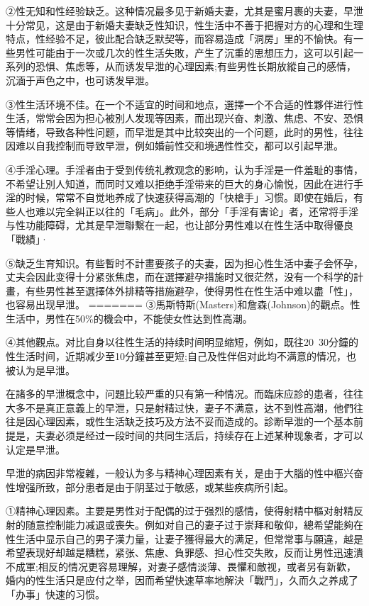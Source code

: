 \documentclass[12pt,UTF8]{ctexbook}
\begin{document}
②性无知和性经验缺乏。这种情况最多见于新婚夫妻，尤其是蜜月裹的夫妻，早泄十分常见，这是由于新婚夫妻缺乏性知识，性生活中不善于把握对方的心理和生理特点，性经验不足，彼此配合缺乏默契等，而容易造成「洞房」里的不愉快。有一些男性可能由于一次或几次的性生活失敗，产生了沉重的思想压力，这可以引起一系列的恐惧、焦虑等，从而诱发早泄的心理因素;有些男性长期放縱自己的感情，沉湎于声色之中，也可诱发早泄。

③性生活环境不佳。在一个不适宜的时间和地点，選擇一个不合适的性夥伴进行性生活，常常会因为担心被別人发现等因素，而出现兴奋、刺激、焦虑、不安、恐惧等情绪，导致各种性问题，而早泄是其中比较突出的一个问题，此时的男性，往往因难以自我控制而导致早泄，例如婚前性交和境遇性性交，都可以引起早泄。

④手淫心理。手淫者由于受到传统礼教观念的影响，认为手淫是一件羞耻的事情，不希望让別人知道，而同时又难以拒绝手淫带来的巨大的身心愉悦，因此在进行手淫的时候，常常不自觉地养成了快速获得高潮的「快槍手」习惯。即使在婚后，有些人也难以完全糾正以往的「毛病」。此外，部分「手淫有害论」者，还常将手淫与性功能障碍，尤其是早泄聯繫在一起，也让部分男性难以在性生活中取得優良「戰績」·

⑤缺乏生育知识。有些暫时不計畫要孩子的夫妻，因为担心性生活中妻子会怀孕，丈夫会因此变得十分紧张焦虑，而在選擇避孕措施时又很茫然，没有一个科学的計畫，有些男性甚至選擇体外排精等措施避孕，使得男性在性生活中难以盡「性」，也容易出现早泄。
=======
③馬斯特斯(Masters)和詹森(Johnson)的觀点。性生活中，男性在50\%的機会中，不能使女性达到性高潮。

④其他觀点。对比自身以往性生活的持续时间明显缩短，例如，既往20~30分鐘的性生活时间，近期减少至10分鐘甚至更短;自己及性伴侣对此均不满意的情况，也被认为是早泄。

在諸多的早泄概念中，问題比较严重的只有第一种情况。而臨床应診的患者，往往大多不是真正意義上的早泄，只是射精过快，妻子不满意，达不到性高潮，他們往往是因心理因素，或性生活缺乏技巧及方法不妥而造成的。診断早泄的一个基本前提是，夫妻必须是经过一段时间的共同生活后，持续存在上述某种现象者，才可以认定是早泄。

早泄的病因非常複雜，一般认为多与精神心理因素有关，是由于大腦的性中樞兴奋性增强所致，部分患者是由于阴茎过于敏感，或某些疾病所引起。

①精神心理因素。主要是男性对于配偶的过于强烈的感情，使得射精中樞对射精反射的随意控制能力减退或喪失。例如对自己的妻子过于崇拜和敬仰，總希望能夠在性生活中显示自己的男子漢力量，让妻子獲得最大的满足，但常常事与願違，越是希望表现好却越是糟糕，紧张、焦慮、負罪感、担心性交失敗，反而让男性迅速潰不成軍;相反的情况更容易理解，对妻子感情淡薄、畏懼和敵视，或者另有新歡，婚内的性生活只是应付之举，因而希望快速草率地解決「戰鬥」，久而久之养成了「办事」快速的习惯。
\end{document}
